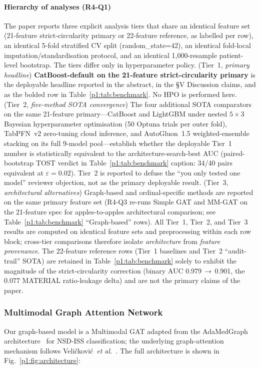 \paragraph*{Hierarchy of analyses (R4-Q1)} The paper reports three explicit analysis tiers that share an identical feature set (21-feature strict-circularity primary or 22-feature reference, as labelled per row), an identical 5-fold stratified CV split (random\_state=42), an identical fold-local imputation/standardisation protocol, and an identical 1{,}000-resample patient-level bootstrap. The tiers differ only in hyperparameter policy. (Tier~1, \emph{primary headline}) \textbf{CatBoost-default on the 21-feature strict-circularity primary} is the deployable headline reported in the abstract, in the §V Discussion claims, and as the bolded row in Table~\ref{p1:tab:benchmark}. No HPO is performed here. (Tier~2, \emph{five-method SOTA convergence}) The four additional SOTA comparators on the same 21-feature primary---CatBoost and LightGBM under nested $5{\times}3$ Bayesian hyperparameter optimisation (50 Optuna trials per outer fold), TabPFN~v2 zero-tuning cloud inference, and AutoGluon~1.5 weighted-ensemble stacking on its full 9-model pool---establish whether the deployable Tier~1 number is statistically equivalent to the architecture-search-best AUC (paired-bootstrap TOST verdict in Table~\ref{p1:tab:benchmark} caption: 34/40 pairs equivalent at $\varepsilon{=}0.02$). Tier~2 is reported to defuse the ``you only tested one model'' reviewer objection, not as the primary deployable result. (Tier~3, \emph{architectural alternatives}) Graph-based and ordinal-specific methods are reported on the same primary feature set (R4-Q3 re-runs Simple GAT and MM-GAT on the 21-feature spec for apples-to-apples architectural comparison; see Table~\ref{p1:tab:benchmark} ``Graph-based'' rows). All Tier~1, Tier~2, and Tier~3 results are computed on identical feature sets and preprocessing within each row block; cross-tier comparisons therefore isolate \emph{architecture} from \emph{feature provenance}. The 22-feature reference rows (Tier~1 baselines and Tier~2 ``audit-trail'' SOTA) are retained in Table~\ref{p1:tab:benchmark} solely to exhibit the magnitude of the strict-circularity correction (binary AUC 0.979$\,\to\,$0.901, the $0.077$ MATERIAL ratio-leakage delta) and are not the primary claims of the paper.

\subsubsection{Multimodal Graph Attention Network}
Our graph-based model is a Multimodal GAT adapted from the AdaMedGraph architecture~\cite{adamedgraph} for NSD-ISS classification; the underlying graph-attention mechanism follows Veli\v{c}kovi\'{c}~\textit{et al.}~\cite{velickovic2018gat}. The full architecture is shown in Fig.~\ref{p1:fig:architecture}:

